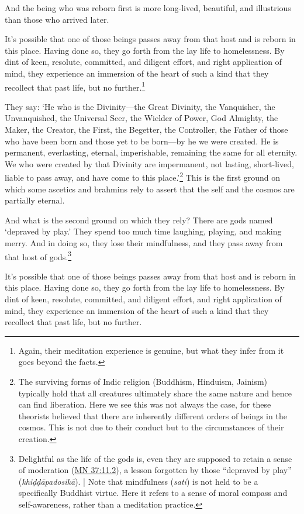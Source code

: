 \documentclass[12pt,openany]{book}%
\begin{document}
And the being who was reborn first is more long-lived, beautiful, and illustrious than those who arrived later. 

It’s possible that one of those beings passes away from that host and is reborn in this place. Having done so, they go forth from the lay life to homelessness. By dint of keen, resolute, committed, and diligent effort, and right application of mind, they experience an immersion of the heart of such a kind that they recollect that past life, but no further.\footnote{Again, their meditation experience is genuine, but what they infer from it goes beyond the facts. } 

They say: ‘He who is the Divinity—the Great Divinity, the Vanquisher, the Unvanquished, the Universal Seer, the Wielder of Power, God Almighty, the Maker, the Creator, the First, the Begetter, the Controller, the Father of those who have been born and those yet to be born—by he we were created. He is permanent, everlasting, eternal, imperishable, remaining the same for all eternity. We who were created by that Divinity are impermanent, not lasting, short-lived, liable to pass away, and have come to this place.’\footnote{The surviving forms of Indic religion (Buddhism, Hinduism, Jainism) typically hold that all creatures ultimately share the same nature and hence can find liberation. Here we see this was not always the case, for these theorists believed that there are inherently different orders of beings in the cosmos. This is not due to their conduct but to the circumstances of their creation. } This is the first ground on which some ascetics and brahmins rely to assert that the self and the cosmos are partially eternal. 

And what is the second ground on which they rely? There are gods named ‘depraved by play.’ They spend too much time laughing, playing, and making merry. And in doing so, they lose their mindfulness, and they pass away from that host of gods.\footnote{Delightful as the life of the gods is, even they are supposed to retain a sense of moderation (\href{https://suttacentral.net/mn37/en/sujato\#11.2}{MN 37:11.2}), a lesson forgotten by those “depraved by play” (\textit{\textsanskrit{khiḍḍāpadosikā}}). | Note that mindfulness (\textit{sati}) is not held to be a specifically Buddhist virtue. Here it refers to a sense of moral compass and self-awareness, rather than a meditation practice. } 

It’s possible that one of those beings passes away from that host and is reborn in this place. Having done so, they go forth from the lay life to homelessness. By dint of keen, resolute, committed, and diligent effort, and right application of mind, they experience an immersion of the heart of such a kind that they recollect that past life, but no further. 
\end{document}
